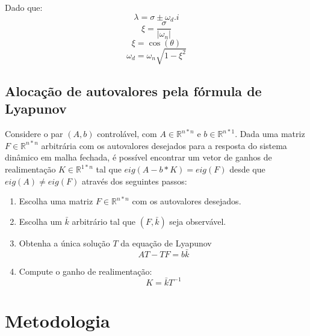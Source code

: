 \documentclass[a4paper]{ifacconf}
\begin{document}
    Dado que:
    \begin{equation} \label{eq:eign}
            \lambda = \sigma \pm \omega_d.i
    \end{equation}
    \begin{equation} \label{eq:xi}
        \xi=\frac{\sigma}{|\omega_n|}
    \end{equation}
    \begin{equation} \label{eq:theta}
            \xi=\cos{(\theta)}
    \end{equation}
    \begin{equation} \label{eq:wd}
            \omega_d=\omega_n\sqrt{1-\xi^2}
    \end{equation}
    
        \subsection{Alocação de autovalores pela fórmula de Lyapunov} \label{sc:lyapunov}
    
    Considere o par $(A,b)$ controlável, com $A \in \mathbb{R}^{n*n}$ e $b \in \mathbb{R}^{n*1}$. Dada uma matriz $F \in \mathbb{R}^{n*n}$ arbitrária com os autovalores desejados para a resposta do sistema dinâmico em malha fechada, é possível encontrar um vetor de ganhos de realimentação $K\in \mathbb{R}^{1*n}$ tal que $eig(A-b*K)=eig(F)$ desde que $eig(A)\neq eig(F)$ através dos seguintes passos:
    
    \begin{enumerate}
        \item Escolha uma matriz $F \in \mathbb{R}^{n*n}$ com os autovalores desejados.
        \item Escolha um $\bar{k}$ arbitrário tal que $(F,\bar{k})$ seja observável.
        \item {Obtenha a única solução $T$ da equação de Lyapunov
        \begin{equation} \label{eq:lyapunov}
            AT-TF=b\bar{k}
        \end{equation}}
        \item {Compute o ganho de realimentação:
        \begin{equation} \label{eq:ganho}
            K=\bar{k}T^{-1}
        \end{equation}}
    \end{enumerate}
    
    \section{Metodologia}
\end{document}

